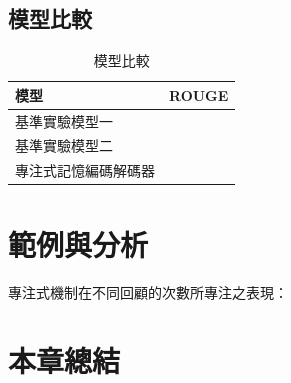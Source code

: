 \subsection{模型比較}
\begin{table}
    \caption{模型比較}
    \label{table:model}
    \centering
    \begin{tabular}{|l|l|}
        \hline
        模型 & ROUGE\\
        \hline
        基準實驗模型一 & \\
        \hline
        基準實驗模型二 & \\
        \hline
        專注式記憶編碼解碼器 & \\
        \hline
    \end{tabular}
\end{table}
\section{範例與分析}
專注式機制在不同回顧的次數所專注之表現：
\begin{figure}
\end{figure}
\section{本章總結}
